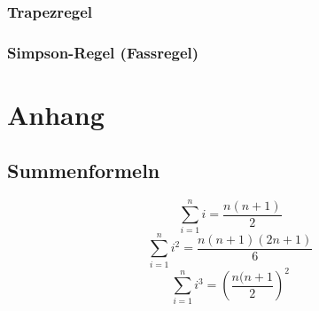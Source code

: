 \subsubsection{Trapezregel}
\subsubsection{Simpson-Regel (Fassregel)}


\section{Anhang}
\subsection{Summenformeln}
\[ \sum_{i=1}^{n}i = \frac{n(n+1)}{2} \]
\[ \sum_{i=1}^{n}i^2 = \frac{n(n+1)(2n+1)}{6} \]
\[ \sum_{i=1}^{n}i^3 = \left(\frac{n(n+1}{2}\right)^2 \]
